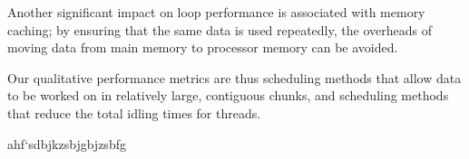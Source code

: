 \documentclass{article} %
\begin{document}
Another significant impact on loop performance is associated with memory caching; by ensuring that the same data is used repeatedly, the overheads of moving data from main memory to processor memory can be avoided.

Our qualitative performance metrics are thus scheduling methods that allow data to be worked on in relatively large, contiguous chunks, and scheduling methods that reduce the total idling times for threads.

ahf`sdbjkzsbjgbjzsbfg



\newpage

\end{document}
